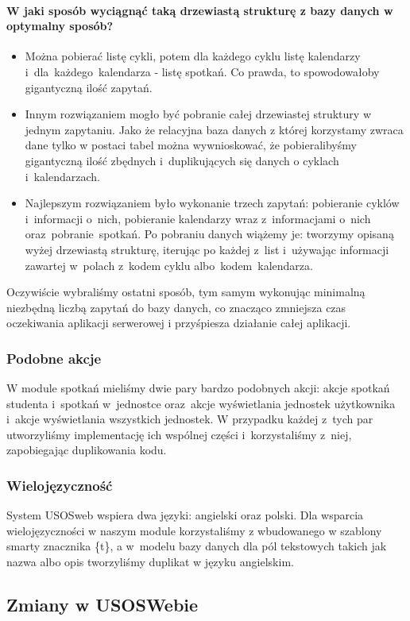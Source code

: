 \documentclass[licencjacka]{pracamgr}
\begin{document}
\paragraph{W jaki sposób wyciągnąć taką drzewiastą strukturę z bazy danych w optymalny sposób?}
\begin{itemize}
  \item
  Można pobierać listę cykli, potem dla każdego cyklu listę kalendarzy i~dla~każdego~kalendarza - listę spotkań. Co prawda, to spowodowałoby gigantyczną ilość zapytań.
  \item
  Innym rozwiązaniem mogło być pobranie całej drzewiastej struktury w jednym zapytaniu. Jako że relacyjna baza danych z której korzystamy zwraca dane tylko w postaci tabel można wywnioskować, że pobieralibyśmy gigantyczną ilość zbędnych i~duplikujących się danych o cyklach i~kalendarzach.
  \item
  Najlepszym rozwiązaniem było wykonanie trzech zapytań: pobieranie cyklów i~informacji o~nich, pobieranie kalendarzy wraz z~informacjami o~nich oraz~pobranie~spotkań. Po pobraniu danych wiążemy je: tworzymy opisaną wyżej drzewiastą strukturę, iterując po każdej z~list i~używając informacji zawartej w~polach z~kodem cyklu albo~kodem~kalendarza.
\end{itemize}
Oczywiście wybraliśmy ostatni sposób, tym samym wykonując minimalną niezbędną liczbą zapytań do bazy danych, co znacząco zmniejsza czas oczekiwania aplikacji serwerowej i przyśpiesza działanie całej aplikacji.

\subsubsection{Podobne akcje}
W module spotkań mieliśmy dwie pary bardzo podobnych akcji: akcje spotkań studenta i~spotkań w~jednostce oraz~akcje wyświetlania jednostek użytkownika i~akcje wyświetlania wszystkich jednostek. W przypadku każdej z~tych par utworzyliśmy implementację ich wspólnej części i~korzystaliśmy z~niej, zapobiegając duplikowania kodu.
\subsubsection{Wielojęzyczność}
System USOSweb wspiera dwa języki: angielski oraz polski. Dla wsparcia wielojęzyczności w naszym module korzystaliśmy z wbudowanego w szablony smarty znacznika \{t\}, a w~modelu bazy danych dla pól tekstowych takich jak nazwa albo opis tworzyliśmy duplikat w języku angielskim.
\subsection{Zmiany w USOSWebie}
\end{document}
